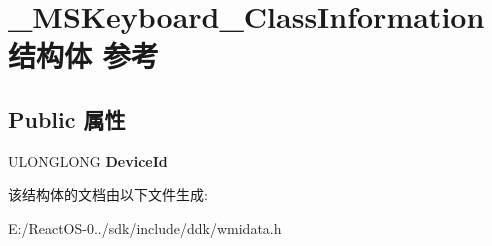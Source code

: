 \hypertarget{struct___m_s_keyboard___class_information}{}\section{\+\_\+\+M\+S\+Keyboard\+\_\+\+Class\+Information结构体 参考}
\label{struct___m_s_keyboard___class_information}
\subsection*{Public 属性}
\begin{DoxyCompactItemize}
\item 
\mbox{\label{struct___m_s_keyboard___class_information_ae0f3799ce3ed063a0dc7ab95bfd164c5}} 
U\+L\+O\+N\+G\+L\+O\+NG {\bfseries Device\+Id}
\end{DoxyCompactItemize}


该结构体的文档由以下文件生成\+:\begin{DoxyCompactItemize}
\item 
E\+:/\+React\+O\+S-\/0../sdk/include/ddk/wmidata.\+h\end{DoxyCompactItemize}
